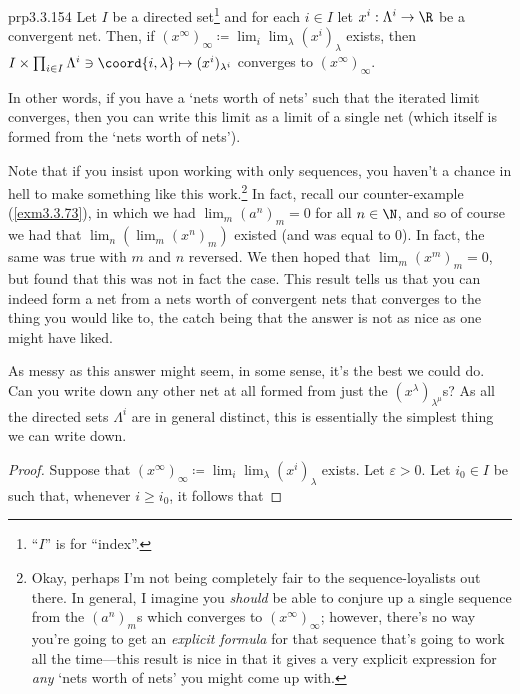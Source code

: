 \begin{prp}{}{prp3.3.154}
Let $I$ be a directed set\footnote{``$I$'' is for ``index''.} and for each $i\in I$ let $x^i:\Lambda ^i\rightarrow \R$ be a convergent net.  Then, if $(x^\infty )_\infty \coloneqq \lim _i\lim _\lambda (x^i)_\lambda$ exists, then $I\times \prod _{i\in I}\Lambda ^i\ni \coord{i,\lambda}\mapsto (x^i)_{\lambda ^i}$ converges to $(x^\infty )_\infty$.
\begin{rmk}
In other words, if you have a `net\textquotesingle s worth of nets' such that the iterated limit converges, then you can write this limit as a limit of a single net (which itself is formed from the `net\textquotesingle s worth of nets').
\end{rmk}
\begin{rmk}
Note that if you insist upon working with only sequences, you haven't a chance in hell to make something like this work.\footnote{Okay, perhaps I'm not being completely fair to the sequence-loyalists out there.  In general, I imagine you \emph{should} be able to conjure up a single sequence from the $(a^n)_m$s which converges to $(x^{\infty})_{\infty}$; however, there's no way you're going to get an \emph{explicit formula} for that sequence that's going to work all the time---this result is nice in that it gives a very explicit expression for \emph{any} `net\textquotesingle s worth of nets' you might come up with.}  In fact, recall our counter-example (\cref{exm3.3.73}), in which we had $\lim _m (a^n)_m=0$ for all $n\in \N$, and so of course we had that $\lim _n\left( \lim _m(x^n)_m\right)$ existed (and was equal to $0$).  In fact, the same was true with $m$ and $n$ reversed.  We then hoped that $\lim _m(x^m)_m=0$, but found that this was not in fact the case.  This result tells us that you can indeed form a net from a nets worth of convergent nets that converges to the thing you would like to, the catch being that the answer is not as nice as one might have liked.
\end{rmk}
\begin{rmk}
As messy as this answer might seem, in some sense, it's the best we could do.  Can you write down any other net at all formed from just the $(x^\lambda )_{\lambda ^\mu}$s?  As all the directed sets $\Lambda ^i$ are in general distinct, this is essentially the simplest thing we can write down.
\end{rmk}
\begin{proof}
Suppose that $(x^\infty )_\infty \coloneqq \lim _i\lim _\lambda (x^i)_\lambda$ exists.  Let $\varepsilon >0$.  Let $i_0\in I$ be such that, whenever $i\geq i_0$, it follows that

\end{proof}
\end{prp}
